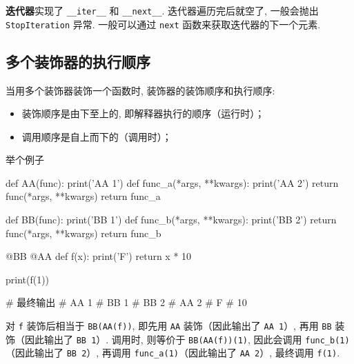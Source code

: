 \textbf{迭代器}实现了 \texttt{__iter__} 和 \texttt{__next__}. 迭代器遍历完后就空了, 一般会抛出 \texttt{StopIteration} 异常. 一般可以通过 \texttt{next} 函数来获取迭代器的下一个元素. 

\subsection{多个装饰器的执行顺序}
当用多个装饰器装饰一个函数时, 装饰器的装饰顺序和执行顺序: 
\begin{itemize}
	\item 装饰顺序是由下至上的, 即解释器执行的顺序（运行时）；
	
	\item 调用顺序是自上而下的（调用时）；
\end{itemize}
举个例子
\begin{python}
	def AA(func):
		print('AA 1')
		def func_a(*args, **kwargs):
			print('AA 2')
			return func(*args, **kwargs)
		return func_a
	
	def BB(func):
		print('BB 1')
		def func_b(*args, **kwargs):
			print('BB 2')
			return func(*args, **kwargs)
		return func_b
	
	@BB
	@AA
	def f(x):
		print('F')
		return x * 10
	
	print(f(1))
	
	# 最终输出
	# AA 1
	# BB 1
	# BB 2
	# AA 2
	# F
	# 10
\end{python}

对 \texttt{f} 装饰后相当于 \texttt{BB(AA(f))}, 即先用 \texttt{AA} 装饰（因此输出了 \texttt{AA 1}）, 再用 \texttt{BB} 装饰（因此输出了 \texttt{BB 1}）. 调用时, 则等价于 \texttt{BB(AA(f))(1)}, 因此会调用 \texttt{func_b(1)}（因此输出了 \texttt{BB 2}）, 再调用 \texttt{func_a(1)}（因此输出了 \texttt{AA 2}）, 最终调用 \texttt{f(1)}. 